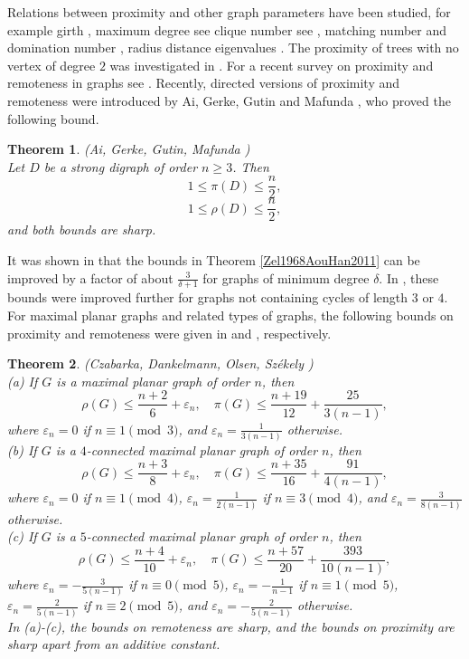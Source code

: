 \documentclass[a4paper,11pt]{article}
\newtheorem{theorem}{Theorem}[section]
\begin{document}
Relations between proximity and other graph parameters have been studied, 
for example girth \cite{AouHan2017},  
maximum degree see \cite{DanMafMal2022, LinTsaShaZha2011, Mal2022} 
clique number see \cite{HuaDas2014},
matching number and domination number \cite{LiaZhoGuo2021, PeiPanWanTia2021},
radius \cite{RisBur2014}
distance eigenvalues \cite{LinDasWu2016}. 
The proximity of trees with no vertex of degree $2$ was investigated in \cite{CheLinZho2022}.
For a recent survey on proximity and remoteness in graphs see \cite{AouRat2024}. 
Recently, directed versions of proximity and remoteness were introduced by Ai, Gerke, Gutin 
and Mafunda \cite{AiGerGutMaf2021}, who proved the following bound. 

\begin{theorem}\label{AiGerGutMaf2021}
{\rm (Ai, Gerke, Gutin, Mafunda \cite{AiGerGutMaf2021})}\\
Let $D$ be a strong digraph of order $n\geq 3$. Then 
\[1 \leq \pi(D)\leq \frac{n}{2},\]
\[1 \leq \rho(D)\leq \frac{n}{2},\]
and both bounds are sharp.
\end{theorem}


It was shown in  \cite{Dan2015} that the bounds in Theorem \ref{Zel1968AouHan2011} can be improved by a factor of about
$\frac{3}{\delta+1}$ for graphs of minimum degree $\delta$. In \cite{DanJonMaf2021}, these bounds were 
improved further for graphs not containing cycles of length $3$ or $4$. 
For maximal planar graphs and related types of graphs, the following bounds on proximity and 
remoteness were given in \cite{CzaDanOlsSze2022} and \cite{CzaDanOlsSze2021}, respectively. 

\begin{theorem}
{\rm (Czabarka, Dankelmann, Olsen, Sz\'{e}kely \cite{CzaDanOlsSze2021})} \\
(a) If $G$ is a maximal planar graph of order $n$, then
\[ \rho(G) \leq \frac{n+2}{6} + \varepsilon_n,  \quad \pi(G) \leq \frac{n+19}{12} + \frac{25}{3(n-1)},  \]
where $\varepsilon_n = 0$ if $n \equiv 1 \pmod{3}$, and $\varepsilon_n = \frac{1}{3(n-1)}$ otherwise. \\ 
(b) If $G$ is a $4$-connected maximal planar graph of order $n$, then
\[ \rho(G) \leq \frac{n+3}{8} + \varepsilon_n, \quad \pi(G) \leq \frac{n+35}{16} + \frac{91}{4(n-1)}, \]
where $\varepsilon_n = 0$ if $n \equiv 1 \pmod{4}$, $\varepsilon_n = \frac{1}{2(n-1)}$ if $n \equiv 3 \pmod{4}$, 
and $\varepsilon_n = \frac{3}{8(n-1)}$ otherwise. \\
(c) If $G$ is a $5$-connected maximal planar graph of order $n$, then
\[ \rho(G) \leq \frac{n+4}{10} + \varepsilon_n, \quad \pi(G) \leq \frac{n+57}{20} + \frac{393}{10(n-1)}, \]
where $\varepsilon_n = -\frac{3}{5(n-1)}$ if $n \equiv 0 \pmod{5}$, $\varepsilon_n = -\frac{1}{n-1}$ if $n \equiv 1 \pmod{5}$, 
$\varepsilon_n = \frac{2}{5(n-1)}$ if $n \equiv 2 \pmod{5}$, 
and $\varepsilon_n = -\frac{2}{5(n-1)}$ otherwise. \\
In (a)-(c), the bounds on remoteness are sharp, and the bounds on proximity are sharp apart from an additive constant. 
\end{theorem}
\end{document}
